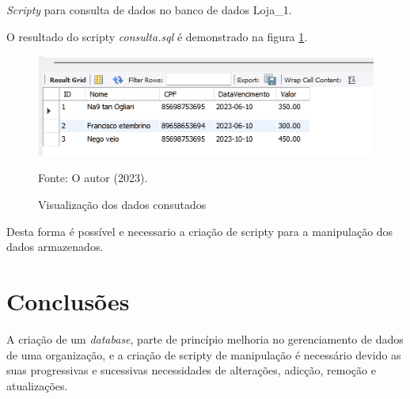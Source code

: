 \par \textit{Scripty} para consulta de dados no banco de dados Loja\_1.



\par O resultado do scripty \textit{consulta.sql} é demonstrado na figura \ref{fig:view}.

\begin{figure}[h!]
\caption{Visualização dos dados consutados}
\begin{center}
   \includegraphics[scale=1]{figure/view.png}
\end{center}
\label{fig:view}
{\fontsize{10pt}{\baselineskip}\selectfont
Fonte: O autor (2023).}
\end{figure}

\par Desta forma é possível e necessario a criação de scripty para a manipulação dos dados armazenados.


\section{Conclusões}
\par A criação de um \textit{database}, parte de princípio melhoria no gerenciamento de dados de uma organização, e a criação de scripty de manipulação é necessário devido as suas progressivas e sucessivas necessidades de alterações, adicção, remoção e atualizações.
